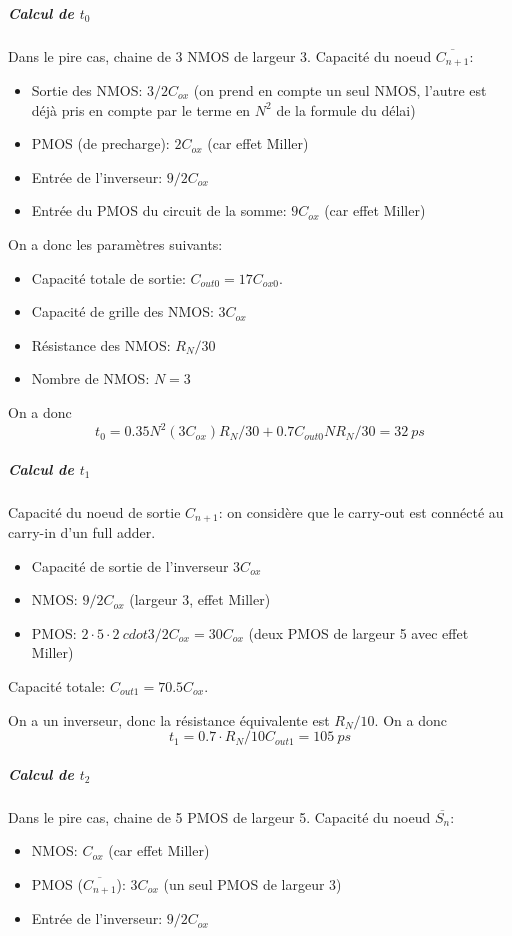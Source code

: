\documentclass[frenchb,DIV=14]{scrartcl}
\begin{document}
\subparagraph{Calcul de $t_0$}
Dans le pire cas, chaine de 3 NMOS de largeur 3.
Capacité du noeud $\overline{C_{n+1}}$:
\begin{itemize}
    \item Sortie des NMOS: $3/2 C_{ox}$ (on prend en compte un seul NMOS, l'autre est
    déjà pris en compte par le terme en $N^2$ de la formule du délai)
    \item PMOS (de precharge): $2C_{ox}$ (car effet Miller)
    \item Entrée de l'inverseur: $9/2 C_{ox}$
    \item Entrée du PMOS du circuit de la somme: $9 C_{ox}$ (car effet Miller)
\end{itemize}

On a donc les paramètres suivants:
\begin{itemize}
    \item Capacité totale de sortie: $C_{out0} = 17 C_{ox0}$.
    \item Capacité de grille des NMOS: $3C_{ox}$
    \item Résistance des NMOS: $R_N/30$
    \item Nombre de NMOS: $N = 3$
\end{itemize}

On a donc
\[t_0 = 0.35 N^2 (3C_{ox}) R_N/30 + 0.7 C_{out0} N R_N/30 = \SI{32}{ps}\]

\subparagraph{Calcul de $t_1$}
Capacité du noeud de sortie $C_{n+1}$: on considère que le carry-out est
connécté au carry-in d'un full adder.
\begin{itemize}
\item Capacité de sortie de l'inverseur $3C_{ox}$
\item NMOS: $9/2 C_{ox}$ (largeur 3, effet Miller)
\item PMOS: $2\cdot 5 \cdot 2 \ cdot 3/2 C_{ox} = 30 C_{ox}$ (deux PMOS de largeur 5 avec effet Miller)
\end{itemize}
Capacité totale: $C_{out1} = 70.5 C_{ox}$.

On a un inverseur, donc la résistance équivalente est $R_N/10$. On a donc
\[t_1 = 0.7 \cdot R_N/10 C_{out1} = \SI{105}{ps}\]

\subparagraph{Calcul de $t_2$}
Dans le pire cas, chaine de 5 PMOS de largeur 5.
Capacité du noeud $\overline{S_n}$:
\begin{itemize}
    \item NMOS: $C_{ox}$ (car effet Miller)
    \item PMOS ($\overline{C_{n+1}}$): $3C_{ox}$ (un seul PMOS de largeur 3)
    \item Entrée de l'inverseur: $9/2 C_{ox}$
\end{itemize}
\end{document}
